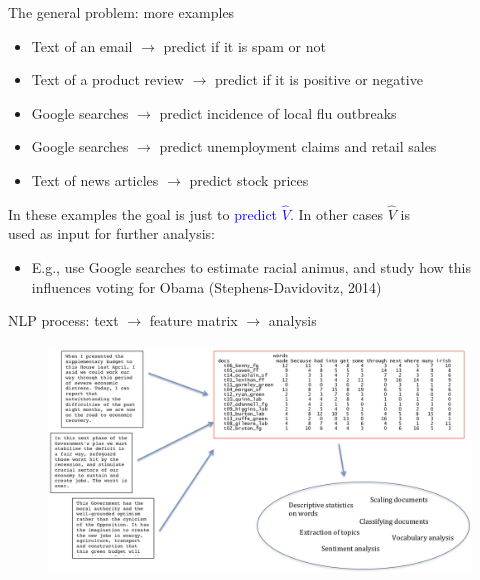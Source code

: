 \documentclass[english]{beamer}
\begin{document}
\begin{frame}{The general problem: more examples}

\begin{itemize}
\setlength{\itemsep}{1em}
\item Text of an email $\longrightarrow$ predict if it is spam or not
\item Text of a product review $\longrightarrow$ predict if it is positive or negative
\item Google searches $\longrightarrow$ predict incidence of local flu outbreaks
\item Google searches $\longrightarrow$ predict unemployment claims and retail sales
\item Text of news articles $\longrightarrow$ predict stock prices
\end{itemize}

\vspace{7pt}

\hspace{-15pt}In these examples the goal is just to \textcolor{blue}{predict $\hat{V}$}. In other cases $\hat{V}$ is\\
\hspace{-15pt}used as input for further analysis:

\vspace{7pt}

\begin{itemize}
\setlength{\itemsep}{1.3em}
\item E.g., use Google searches to estimate racial animus, and study how this influences voting for Obama (Stephens-Davidovitz, 2014)
\end{itemize}

\end{frame}

%

\begin{frame}{NLP process: text $\rightarrow$ feature matrix $\rightarrow$ analysis}

\begin{figure}[h]
\begin{centering}
\includegraphics[height=2.4in]{Images/fig5}
\end{centering}
\end{figure}
\end{frame}
\end{document}
